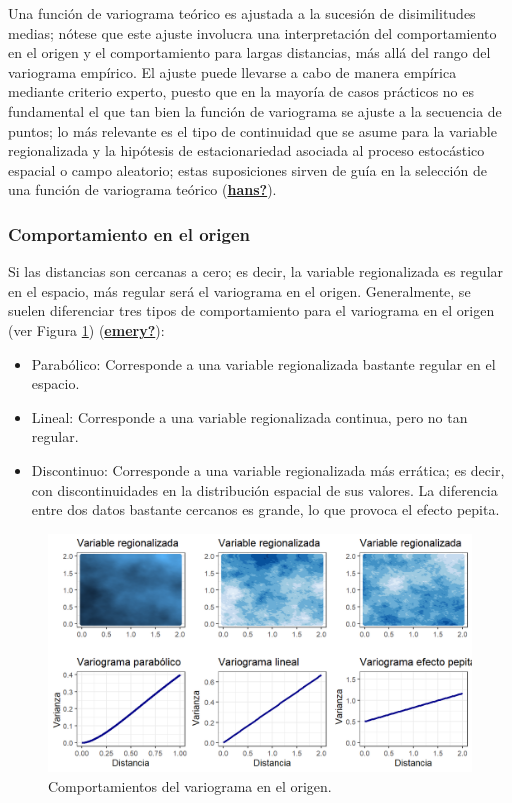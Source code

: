 \documentclass[
]{book}
\begin{document}
Una función de variograma teórico es ajustada a la sucesión de disimilitudes medias; nótese que este ajuste involucra una interpretación del comportamiento en el origen y el comportamiento para largas distancias, más allá del rango del variograma empírico. El ajuste puede llevarse a cabo de manera empírica mediante criterio experto, puesto que en la mayoría de casos prácticos no es fundamental el que tan bien la función de variograma se ajuste a la secuencia de puntos; lo más relevante es el tipo de continuidad que se asume para la variable regionalizada y la hipótesis de estacionariedad asociada al proceso estocástico espacial o campo aleatorio; estas suposiciones sirven de guía en la selección de una función de variograma teórico (\protect\hyperlink{ref-hans}{\textbf{hans?}}).

\hypertarget{comportamiento-en-el-origen}{%
\subsubsection*{Comportamiento en el origen}\label{comportamiento-en-el-origen}}

Si las distancias son cercanas a cero; es decir, la variable regionalizada es regular en el espacio, más regular será el variograma en el origen. Generalmente, se suelen diferenciar tres tipos de comportamiento para el variograma en el origen (ver Figura \ref{fig:varcomp}) (\protect\hyperlink{ref-emery}{\textbf{emery?}}):

\begin{itemize}
\item
  Parabólico: Corresponde a una variable regionalizada bastante regular en el espacio.
\item
  Lineal: Corresponde a una variable regionalizada continua, pero no tan regular.
\item
  Discontinuo: Corresponde a una variable regionalizada más errática; es decir, con discontinuidades en la distribución espacial de sus valores. La diferencia entre dos datos bastante cercanos es grande, lo que provoca el efecto pepita.
\end{itemize}

\begin{figure}
\includegraphics[width=17.78in]{figuras/otros/var_comp} \caption{Comportamientos del variograma en el origen.}\label{fig:varcomp}
\end{figure}
\end{document}
